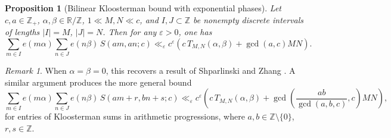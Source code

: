 \documentclass[reqno,11pt]{amsart}
\newtheorem{proposition}[theorem]{Proposition}
\theoremstyle{remark}
\newtheorem*{remark}{Remark}
\numberwithin{equation}{section}
\newcommand{\Z}{\mathbb{Z}}
\newcommand{\R}{\mathbb{R}}
\newcommand{\eps}{\varepsilon}
\begin{document}
\begin{proposition}[Bilinear Kloosterman bound with exponential phases] \label{prop:bilinear-expo-phases}
Let $c, a \in \Z_+$, $\alpha, \beta \in \R/\Z$, $1 \ll M, N \ll c$, and $I, J \subset \Z$ be nonempty discrete intervals of lengths $|I| = M$, $|J| = N$. Then for any $\eps > 0$, one has
\[
    \sum_{m \in I} e(m\alpha) \sum_{n \in J} e(n\beta)\, S(am, an; c) 
    \ll_\eps 
    c^\eps \left(c\, T_{M,N}(\alpha, \beta) + \gcd(a, c) MN\right).
\]
\end{proposition}

\begin{remark}
When $\alpha = \beta = 0$, this recovers a result of Shparlinski and Zhang \cite{shparlinski2016cancellations}.
A similar argument produces the more general bound
\[
    \sum_{m \in I} e(m\alpha) \sum_{n \in J} e(n\beta)\, S(am+r, bn+s; c) 
    \ll_\eps 
    c^\eps \left(c\, T_{M,N}(\alpha, \beta) + \gcd\left(\frac{ab}{\gcd(a,b,c)}, c\right)MN\right),
\]
for entries of Kloosterman sums in arithmetic progressions, where $a, b \in \Z \setminus \{0\}$, $r, s \in \Z$.
\end{remark}
\end{document}
